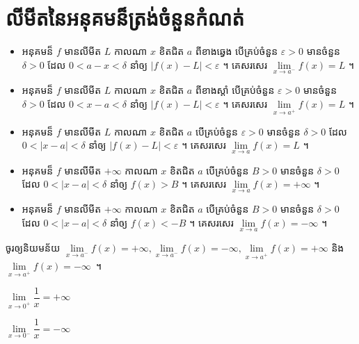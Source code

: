 \documentclass[a5paper,leqno,fleqn]{book}
\begin{document}
\section{លីមីតនៃអនុគមន៏ត្រង់ចំនួនកំណត់}
\begin{definition}{}{}
	\begin{itemize}
	\item អនុគមន៏ $ f $ មានលីមីត $ L $ កាលណា $ x $ ខិតជិត $ a $ ពីខាងឆ្វេង បើគ្រប់ចំនួន $ \varepsilon>0 $ មានចំនួន $ \delta>0 $ ដែល $ 0<a-x<\delta $ នាំឲ្យ $ |f(x)-L|<\varepsilon $ ។ គេសរសេរ $ \lim\limits_{x\to a^-}f(x)=L $ ។
	\item អនុគមន៏ $ f $ មានលីមីត $ L $ កាលណា $ x $ ខិតជិត $ a $ ពីខាងស្ដាំ បើគ្រប់ចំនួន $ \varepsilon>0 $ មានចំនួន $ \delta>0 $ ដែល $ 0<x-a<\delta $ នាំឲ្យ $ |f(x)-L|<\varepsilon $ ។ គេសរសេរ $ \lim\limits_{x\to a^+}f(x)=L $ ។
	\item អនុគមន៏ $ f $ មានលីមីត $ L $ កាលណា $ x $ ខិតជិត $ a $ បើគ្រប់ចំនួន $ \varepsilon>0 $ មានចំនួន $ \delta>0 $ ដែល $ 0<|x-a|<\delta $ នាំឲ្យ $ |f(x)-L|<\varepsilon $ ។ គេសរសេរ $ \lim\limits_{x\to a}f(x)=L $ ។
	\item អនុគមន៏ $ f $ មានលីមីត $ +\infty $ កាលណា $ x $ ខិតជិត $ a $ បើគ្រប់ចំនួន $ B>0 $ មានចំនួន $ \delta>0 $ ដែល $ 0<|x-a|<\delta $ នាំឲ្យ $ f(x)>B $ ។ គេសរសេរ $ \lim\limits_{x\to a}f(x)=+\infty $ ។
	\item អនុគមន៏ $ f $ មានលីមីត $ +\infty $ កាលណា $ x $ ខិតជិត $ a $ បើគ្រប់ចំនួន $ B>0 $ មានចំនួន $ \delta>0 $ ដែល $ 0<|x-a|<\delta $ នាំឲ្យ $ f(x)<-B $ ។ គេសរសេរ $ \lim\limits_{x\to a}f(x)=-\infty $ ។
	\end{itemize}
\end{definition}
\begin{exercise}{}{}
	ចូរឲ្យនិយមន័យ $ \lim\limits_{x\to a^-}f(x)=+\infty ,\lim\limits_{x\to a^-}f(x)=-\infty ,\lim\limits_{x\to a^+}f(x)=+\infty $ និង $ \lim\limits_{x\to a^+}f(x)=-\infty $~។
\end{exercise}
\begin{generality}{}{}
	\begin{itemize}
	\end{itemize}
\end{generality}
\end{document}
